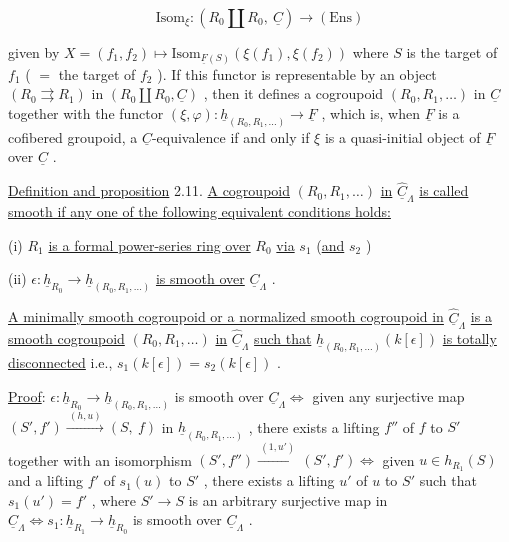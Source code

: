 \begin{equation*}
\mathrm{Isom}_{\xi} : (R_0 \amalg R_0,\ \underline{C}) \to (\mathrm{Ens}) 
\end{equation*}


 given by  $X = (f_1,f_2) \longmapsto \mathrm{Isom}_{\underline{F}(S)}(\xi(f_1),\xi(f_2))$  where  $S$  is the target of  $f_1$ ( $=$ the target of  $f_2$ ). If this functor is representable by an object  $(R_0 \rightrightarrows R_1)$ in  $(R_0 \amalg R_0, \underline{C})$  , then it defines  a cogroupoid  $(R_0,R_1,\ldots)$  in  $\underline{C}$  together with the functor  $(\xi,\varphi) : \underline{h}_{(R_0,R_1,\ldots)} \to \underline{F}$ , which is, when  $\underline{F}$  is a cofibered groupoid, a  $\underline{C}$-equivalence if and only if  $\xi$  is a quasi-initial object of  $\underline{F}$  over  $\underline{C}$ .


\underline{Definition and proposition} 2.11.  \underline{A cogroupoid}  $(R_0,R_1,\ldots)$  \underline{in}  $\hat{\underline{C}}_\Lambda$  \underline{is called smooth if any one of the following equivalent conditions holds:}

 (i)  $R_1$  \underline{is a formal power-series ring over}  $R_0$  \underline{via} $s_1$  (\underline{and}  $s_2$ )

 (ii)  $\epsilon : \underline{h}_{R_0} \longrightarrow \underline{h}_{(R_0,R_1,\ldots)}$  \underline{is smooth over}  $\underline{C}_\Lambda$ .

\underline{A minimally smooth cogroupoid or a normalized smooth cogroupoid in}  $\hat{\underline{C}}_\Lambda$  \underline{is a smooth cogroupoid}  $(R_0,R_1,\ldots)$  \underline{in}  $\hat{\underline{C}}_\Lambda$  \underline{such that}  $\underline{h}_{(R_0,R_1,\ldots)}(k[\epsilon])$  \underline{is totally disconnected} i.e.,  $s_1(k[\epsilon]) = s_2(k[\epsilon])$  .

\underline{Proof}:  $\epsilon : \underline{h}_{R_0} \to \underline{h}_{(R_0,R_1,\ldots)}$  is smooth over  $\underline{C}_\Lambda \Leftrightarrow$ given any surjective map  $(S',f') \xrightarrow{\ (h,u)\ } (S,\ f)$  in  $\underline{h}_{(R_0,R_1,\ldots)}$  , there exists a lifting  $f''$  of  $f$ to  $S'$  together with an isomorphism  $(S',f'') \xrightarrow{\ (1,u')\ } (S',f') \Leftrightarrow$ given  $u \in h_{R_1}(S)$ and a lifting  $f'$  of  $s_1(u)$  to  $S'$  , there exists a lifting  $u'$  of  $u$  to  $S'$ such that  $s_1(u') = f'$  , where  $S' \to S$  is an arbitrary surjective map in $\underline{C}_\Lambda \Leftrightarrow s_1 : \underline{h}_{R_1} \to \underline{h}_{R_0}$  is smooth over  $\underline{C}_\Lambda$ .


